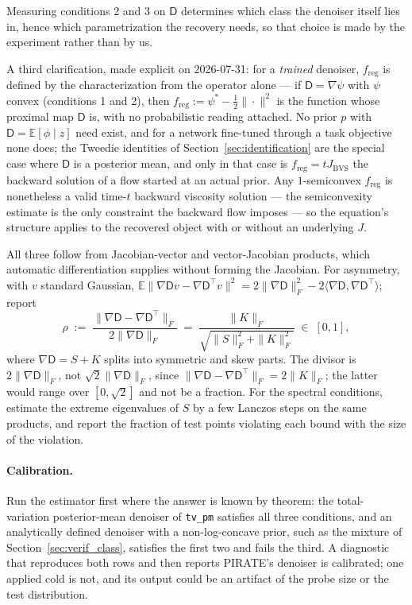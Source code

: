 \documentclass[11pt]{article}
\theoremstyle{definition}
\newcommand{\E}{\mathbb{E}}
\newcommand{\D}{\mathsf{D}}
\newcommand{\freg}{f_{\mathrm{reg}}}
\newcommand{\code}[1]{\texttt{#1}}
\newcommand{\Jbvs}{J_{\mathrm{BVS}}}
\begin{document}
Measuring conditions 2 and 3 on $\D$ determines which class the denoiser itself lies in, hence which parametrization the recovery needs, so that choice is made by the experiment rather than by us.

A third clarification, made explicit on 2026-07-31: for a \emph{trained} denoiser, $\freg$ is defined by the characterization from the operator alone --- if $\D = \nabla\psi$ with $\psi$ convex (conditions 1 and 2), then $\freg := \psi^* - \tfrac12\|\cdot\|^2$ is the function whose proximal map $\D$ is, with no probabilistic reading attached. No prior $p$ with $\D = \mathbb{E}[\phi \mid z]$ need exist, and for a network fine-tuned through a task objective none does; the Tweedie identities of Section~\ref{sec:identification} are the special case where $\D$ is a posterior mean, and only in that case is $\freg = t\Jbvs$ the backward solution of a flow started at an actual prior. Any $1$-semiconvex $\freg$ is nonetheless a valid time-$t$ backward viscosity solution --- the semiconvexity estimate is the only constraint the backward flow imposes --- so the equation's structure applies to the recovered object with or without an underlying $J$.

All three follow from Jacobian-vector and vector-Jacobian products, which automatic differentiation supplies without forming the Jacobian. For asymmetry, with $v$ standard Gaussian, $\E\|\nabla\D v - \nabla\D^\top v\|^2 = 2\|\nabla\D\|_F^2 - 2\langle\nabla\D,\nabla\D^\top\rangle$; report
\[
\rho \;:=\; \frac{\|\nabla\D - \nabla\D^\top\|_F}{2\|\nabla\D\|_F} \;=\; \frac{\|K\|_F}{\sqrt{\|S\|_F^2+\|K\|_F^2}} \;\in\;[0,1],
\]
where $\nabla\D = S+K$ splits into symmetric and skew parts. The divisor is $2\|\nabla\D\|_F$, not $\sqrt2\|\nabla\D\|_F$, since $\|\nabla\D-\nabla\D^\top\|_F = 2\|K\|_F$; the latter would range over $[0,\sqrt2]$ and not be a fraction. For the spectral conditions, estimate the extreme eigenvalues of $S$ by a few Lanczos steps on the same products, and report the fraction of test points violating each bound with the size of the violation.

\paragraph{Calibration.} Run the estimator first where the answer is known by theorem: the total-variation posterior-mean denoiser of \code{tv\_pm} satisfies all three conditions, and an analytically defined denoiser with a non-log-concave prior, such as the mixture of Section~\ref{sec:verif_class}, satisfies the first two and fails the third. A diagnostic that reproduces both rows and then reports PIRATE's denoiser is calibrated; one applied cold is not, and its output could be an artifact of the probe size or the test distribution.
\end{document}
